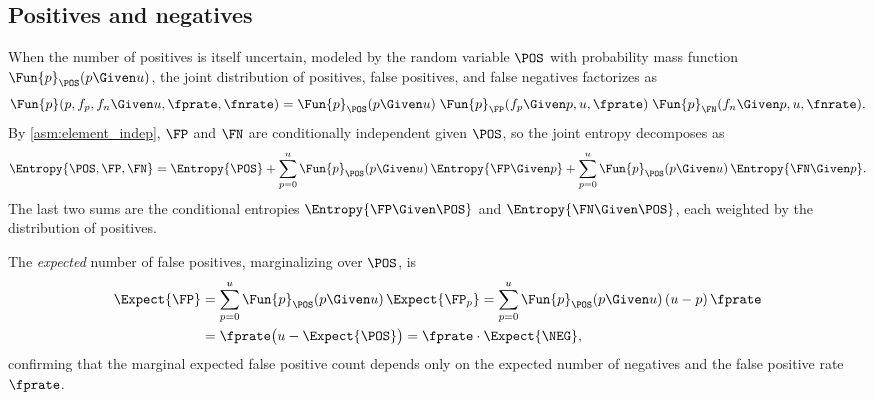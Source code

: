 \subsection{Positives and negatives}
\label{sec:entropy:pos_neg}
When the number of positives is itself uncertain, modeled by the random
variable $\POS$ with probability mass function $\Fun{p}_{\POS}(p \Given u)$,
the joint distribution of positives, false positives, and false negatives
factorizes as
\begin{equation}
\label{eq:joint_pos_fp_fn}
    \Fun{p}(p, f_p, f_n \Given u, \fprate, \fnrate)
    = \Fun{p}_{\POS}(p \Given u)
      \;\Fun{p}_{\FP}(f_p \Given p, u, \fprate)
      \;\Fun{p}_{\FN}(f_n \Given p, u, \fnrate).
\end{equation}
By \cref{asm:element_indep}, $\FP$ and $\FN$ are conditionally independent
given $\POS$, so the joint entropy decomposes as
\begin{equation}
\label{eq:joint_entropy_pos}
    \Entropy{\POS, \FP, \FN}
    = \Entropy{\POS}
    + \sum_{p=0}^{u} \Fun{p}_{\POS}(p \Given u)\, \Entropy{\FP \Given p}
    + \sum_{p=0}^{u} \Fun{p}_{\POS}(p \Given u)\, \Entropy{\FN \Given p}.
\end{equation}
The last two sums are the conditional entropies $\Entropy{\FP \Given \POS}$
and $\Entropy{\FN \Given \POS}$, each weighted by the distribution of
positives.

\begin{example}
The \emph{expected} number of false positives, marginalizing over $\POS$, is
\begin{align}
    \Expect{\FP}
    &= \sum_{p=0}^{u} \Fun{p}_{\POS}(p \Given u)\, \Expect{\FP_p}
     = \sum_{p=0}^{u} \Fun{p}_{\POS}(p \Given u)\, (u - p)\,\fprate \notag \\
    &= \fprate \bigl(u - \Expect{\POS}\bigr)
     = \fprate \cdot \Expect{\NEG},
\end{align}
confirming that the marginal expected false positive count depends only on the
expected number of negatives and the false positive rate $\fprate$.
\end{example}
